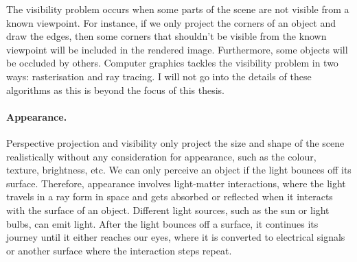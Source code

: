 The visibility problem occurs when some parts of the scene are not visible from a known viewpoint. For instance, if we only project the corners of an object and draw the edges, then some corners that shouldn't be visible from the known viewpoint will be included in the rendered image. Furthermore, some objects will be occluded by others. Computer graphics tackles the visibility problem in two ways: rasterisation and ray tracing. I will not go into the details of these algorithms as this is beyond the focus of this thesis.


\paragraph{Appearance.}
Perspective projection and visibility only project the size and shape of the scene realistically without any consideration for appearance, such as the colour, texture, brightness, etc. We can only perceive an object if the light bounces off its surface. Therefore, appearance involves light-matter interactions, where the light travels in a ray form in space and gets absorbed or reflected when it interacts with the surface of an object. Different light sources, such as the sun or light bulbs, can emit light. After the light bounces off a surface, it continues its journey until it either reaches our eyes, where it is converted to electrical signals or another surface where the interaction steps repeat.

